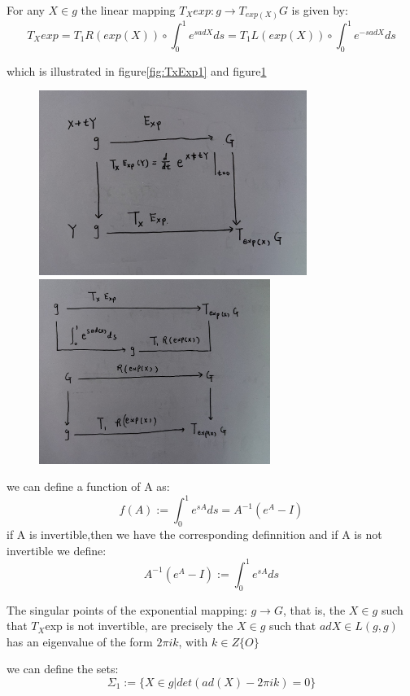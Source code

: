 \begin{theorem}
For any $X\in g$  the linear mapping $T_Xexp:g\rightarrow T_{exp(X)}G$ is given by:
\[T_Xexp=T_1R(exp(X))\circ \int_0^1e^{sadX}ds=T_1L(exp(X))\circ\int_0^1e^{-s adX}ds\]
\end{theorem}
which is illustrated in figure\ref{fig:TxExp1} and figure\ref{fig:TxExp2}\par
\begin{figure}
\begin{minipage}[t]{0.5\linewidth}
\centering
\includegraphics[width=\textwidth,height=6cm]{figures/TxExp1.jpg}
\caption{}
\label{fig:TxExp1}
\end{minipage}
\begin{minipage}[t]{0.5\linewidth}
\centering
\includegraphics[width=\textwidth,height=6cm]{figures/TxExp2.jpg}
\caption{}
\label{fig:TxExp2}
\end{minipage}
\end{figure}

we can define a function of A as:
\[f(A):=\int_0^1e^{sA}ds=A^{-1}(e^A-I)\]
if A is invertible,then we have the corresponding definnition and if A is not invertible we define:
\[A^{-1}(e^A-I):=\int_0^1e^{sA}ds\]
\begin{lemma}
The singular points of the exponential mapping: $g \rightarrow G$, that is, the $X \in g$ such that $T_X$exp is not invertible, are precisely the $X \in g$ such that $ad X \in L(g, g)$ has an eigenvalue of the form $2\pi ik$, with $k \in Z \{O\}$
\end{lemma}
we can define the sets:
\[\Sigma_1:=\{X\in g| det(ad(X)-2\pi ik)=0\}\]
